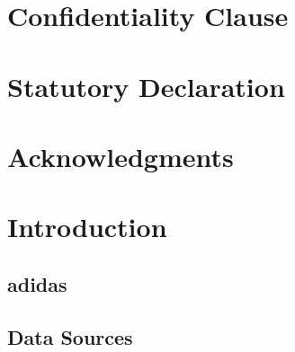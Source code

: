 \documentclass[12pt, twoside]{article}
\numberwithin{equation}{section}
\numberwithin{table}{section}
\numberwithin{figure}{section}
\renewcommand{\headrulewidth}{0.5pt}
\begin{document}
\thispagestyle{empty}	



\newpage
\null\thispagestyle{empty}
\newpage

\thispagestyle{empty}
\section*{Confidentiality Clause}
%
\clearpage

\newpage
\null\thispagestyle{empty}

\newpage
\thispagestyle{empty}
\section*{Statutory Declaration}
%
\clearpage

\newpage
\null\thispagestyle{empty}


\newpage
\thispagestyle{empty}
\section*{Acknowledgments}
%
\newpage
\null\thispagestyle{empty}
\newpage


\fancyhf{}
\thispagestyle{empty}
\fancyhead[R]{\footnotesize \nouppercase{\leftmark}}
\fancyhead[L]{}

\tableofcontents
{}
\newpage


\setcounter{page}{1} 


\renewcommand{\headrulewidth}{1pt}
\fancyhead[LO,RE]{\footnotesize \nouppercase{\leftmark}}
\fancyhead[RO,LE]{\footnotesize \thepage}



\thispagestyle{plain}
\section{Introduction} \label{sec:introduction}

\subsection{adidas} \label{ssec:adidas}
%
\subsection{Data Sources} \label{ssec:data_sources}

\end{document}
